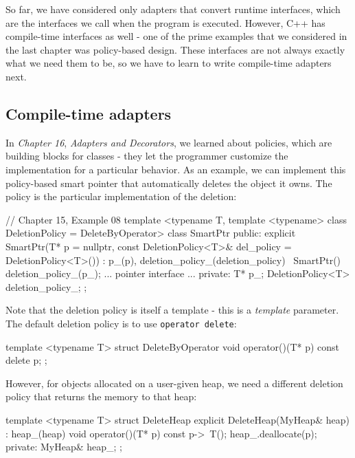 So far, we have considered only adapters that convert runtime interfaces, which are the interfaces we call when the program is executed. However, C++ has compile-time interfaces as well - one of the prime examples that we considered in the last chapter was policy-based design. These interfaces are not always exactly what we need them to be, so we have to learn to write compile-time adapters next.

\subsection{Compile-time adapters}

In \emph{Chapter 16}, \emph{Adapters and Decorators}, we learned about policies, which are building blocks for classes - they let the programmer customize the implementation for a particular behavior. As an example, we can implement this policy-based smart pointer that automatically deletes the object it owns. The policy is the particular implementation of the deletion:

\begin{code}
// Chapter 15, Example 08
template <typename T,
          template <typename> class DeletionPolicy =
                                    DeleteByOperator>
class SmartPtr {
  public:
  explicit SmartPtr(T* p = nullptr,
    const DeletionPolicy<T>& del_policy =
                             DeletionPolicy<T>())
  : p_(p), deletion_policy_(deletion_policy)
  {}
  ~SmartPtr() {
    deletion_policy_(p_);
  }
  ... pointer interface ...
  private:
  T* p_;
  DeletionPolicy<T> deletion_policy_;
};
\end{code}

Note that the deletion policy is itself a template - this is a \emph{template} parameter. The default deletion policy is to use \texttt{operator\ delete}:

\begin{code}
template <typename T> struct DeleteByOperator {
  void operator()(T* p) const {
    delete p;
  }
};
\end{code}

However, for objects allocated on a user-given heap, we need a different deletion policy that returns the memory to that heap:

\begin{code}
template <typename T> struct DeleteHeap {
  explicit DeleteHeap(MyHeap& heap) : heap_(heap) {}
  void operator()(T* p) const {
    p->~T();
    heap_.deallocate(p);
  }
  private:
  MyHeap& heap_;
};
\end{code}

